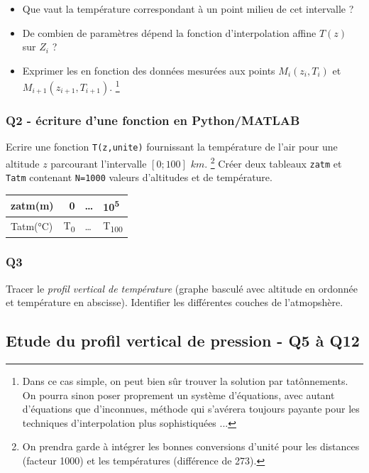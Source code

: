 \documentclass[letterpaper, 11pt]{article}
\begin{document}
\begin{itemize}
\begin{itemize}
\begin{itemize}
\item Que vaut la température correspondant à un point milieu de cet intervalle ?
\item De combien de paramètres dépend la fonction d'interpolation affine \(T(z)\) sur \(Z_{i}\) ?
\item Exprimer les en fonction des données mesurées aux points \(M_{i}(z_i,T_i)\) et \(M_{i+1}(z_{i+1}, T_{i+1})\). \footnote{Dans ce cas simple, on peut bien sûr trouver la solution par tatônnements. On pourra sinon poser proprement un système d'équations, avec autant d'équations que d'inconnues, méthode qui s'avérera toujours payante pour les techniques d'interpolation plus sophistiquées ...}
\end{itemize}

\subsubsection*{Q2 - écriture d'une fonction en Python/MATLAB}
\label{sec:org1e34d63}
Ecrire une fonction \texttt{T(z,unite)} fournissant la température de l'air pour une altitude \(z\)  parcourant l'intervalle \([0 ; 100]\) \(km\). \footnote{On prendra garde à intégrer les bonnes conversions d'unité pour les distances (facteur 1000) et les températures (différence de 273).}
Créer deux tableaux \texttt{zatm} et \texttt{Tatm} contenant \texttt{N=1000} valeurs d'altitudes et de température.

\begin{center}
\begin{tabular}{lrll}
zatm(m) & 0 & \ldots{} & 10\textsuperscript{5}\\
\hline
Tatm(°C) & T\textsubscript{0} & \ldots{} & T\textsubscript{100}\\
\end{tabular}
\end{center}


\subsubsection*{Q3}
\label{sec:org71a933f}
Tracer le \emph{\emph{profil vertical de température}} (graphe basculé avec altitude en ordonnée et température en abscisse). Identifier les différentes couches de l'atmopshère.



\subsection{Etude du profil vertical de pression - Q5 à Q12}
\label{sec:org05bed0b}



\end{itemize}
\end{itemize}
\end{document}
